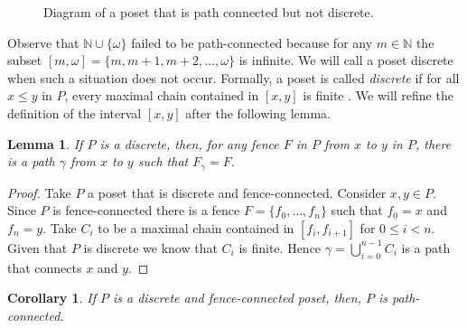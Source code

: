 \documentclass{article}[12pt]
\theoremstyle{exampstyle}
\newtheorem{corollary}[theorem]{Corollary}
\newtheorem{lemma}[theorem]{Lemma}
\theoremstyle{remark}
\newcommand{\N}{\mathbb{N}}
\newcommand{\tuple}[3][1]{#2_{#1}, \dots , #2_{#3}}
\begin{document}
\begin{figure}[h]
    \centering
    \caption{Diagram of a poset that is path connected but not discrete.}
    \label{fig:path_connected_no_discrete}
\end{figure}
    
Observe that $\N \cup \{\omega\}$ failed to be path-connected because for any $m \in \N$ the subset $[m,\omega] = \{m ,m+1,m+2, ..., \omega\} $ is infinite. We will call a poset discrete when such a situation does not occur. Formally, a poset is called \textit{discrete} if for all $x \leq y$ in $P$, every maximal chain contained in $[x,y]$ is finite \cite{discrete_poset_distances}. We will refine the definition of the interval $[x,y]$ after the following lemma.

\begin{lemma}
If $P$ is a discrete, then, for any fence $F$ in $P$ from  $x$ to $y$ in $P$, there is a path $\gamma$ from  $x$ to $y$  such that $F_\gamma = F$.
\label{lemma:each F has gamma}
\end{lemma}
\begin{proof}
   Take $P$ a poset that is discrete and fence-connected. Consider $x,y \in P$. Since $P$ is fence-connected there is a fence $F = \{\tuple[0]{f}{n}\}$ such that $f_0 = x$ and $f_n=y$. Take $C_i$ to be a maximal chain contained in $[f_i,f_{i+1}]$ for $ 0\leq i <n$. Given that $P$ is discrete we know that $C_i$ is finite. Hence $\gamma = \bigcup_{i=0}^{n-1} C_i$ is a path that connects $x$ and $y$.
\end{proof}

\begin{corollary}
If $P$ is a discrete and fence-connected poset, then, $P$ is path-connected.
\label{coro: fence+discrete}
\end{corollary}
\end{document}

